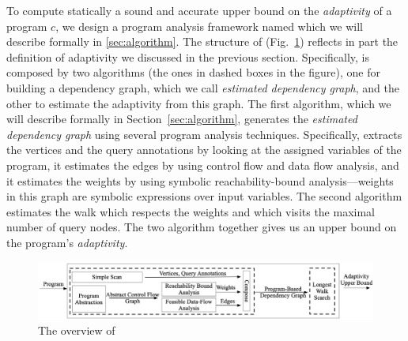 To compute statically a sound and accurate upper bound on the \emph{adaptivity} of a program $c$,
we design a program analysis framework named {\THESYSTEM} which we will describe formally in \ref{sec:algorithm}. 
The structure of {\THESYSTEM} (Fig.~\ref{fig:adaptfun}) reflects in part the definition of adaptivity we discussed in the previous section. Specifically, {\THESYSTEM} is composed by two algorithms (the ones in dashed boxes in the figure), one for building a dependency graph, which we call \emph{estimated dependency graph}, and the other to estimate the adaptivity from this graph.  
The first algorithm, which we will describe formally in Section~\ref{sec:algorithm}, generates the \emph{estimated dependency graph} using several program analysis techniques. Specifically, {\THESYSTEM} extracts the vertices and the query annotations by looking at the assigned variables of the program, it estimates the edges by using control flow and data flow analysis, and it estimates the weights by using symbolic reachability-bound analysis---weights in this graph are symbolic expressions over input variables. 
The second algorithm estimates the
walk which respects the weights and which visits the maximal number of query nodes.
The two algorithm together gives us an  upper bound on the program's \emph{adaptivity}.

 \begin{figure}
  \centering    
\includegraphics[width=1.0\columnwidth]{adapfun.png}
  \vspace{-0.8cm}
  \caption{The overview of {\THESYSTEM}}
  \label{fig:adaptfun}
  \vspace{-0.5cm}
\end{figure}

